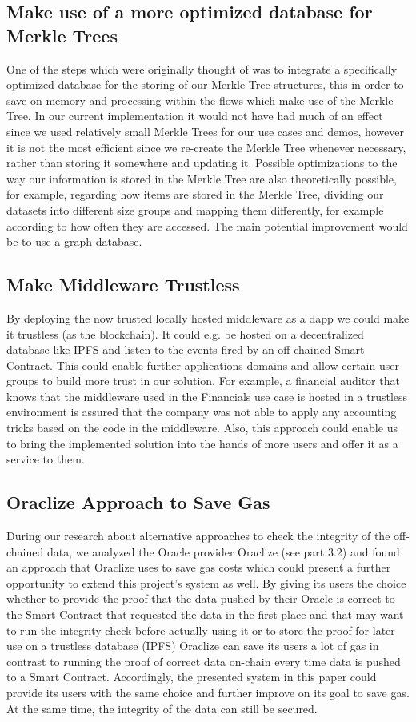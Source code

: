\subsection{Make use of a more optimized database for Merkle Trees}
One of the steps which were originally thought of was to integrate a specifically optimized database for the storing of our Merkle Tree structures, this in order to save on memory and processing within the flows which make use of the Merkle Tree.
In our current implementation it would not have had much of an effect since we used relatively small Merkle Trees for our use cases and demos, however it is not the most efficient since we re-create the Merkle Tree whenever necessary, rather than storing it somewhere and updating it.
Possible optimizations to the way our information is stored in the Merkle Tree are also theoretically possible, for example, regarding how items are stored in the Merkle Tree, dividing our datasets into different size groups and mapping them differently, for example according to how often they are accessed.
The main potential improvement would be to use a graph database.

\subsection{Make Middleware Trustless}
By deploying the now trusted locally hosted middleware as a dapp we could make it trustless (as the blockchain). It could e.g. be hosted on a decentralized database like IPFS and listen to the events fired by an off-chained Smart Contract. This could enable further applications domains and allow certain user groups to build more trust in our solution. For example, a financial auditor that knows that the middleware used in the Financials use case is hosted in a trustless environment is assured that the company was not able to apply any accounting tricks based on the code in the middleware. Also, this approach could enable us to bring the implemented solution into the hands of more users and offer it as a service to them.

\subsection{Oraclize Approach to Save Gas}
During our research about alternative approaches to check the integrity of the off-chained data, we analyzed the Oracle provider Oraclize (see part 3.2) and found an approach that Oraclize uses to save gas costs which could present a further opportunity to extend this project’s system as well. By giving its users the choice whether to provide the proof that the data pushed by their Oracle is correct to the Smart Contract that requested the data in the first place and that may want to run the integrity check before actually using it or to store the proof for later use on a trustless database (IPFS) Oraclize can save its users a lot of gas in contrast to running the proof of correct data on-chain every time data is pushed to a Smart Contract. Accordingly, the presented system in this paper could provide its users with the same choice and further improve on its goal to save gas. At the same time, the integrity of the data can still be secured.

